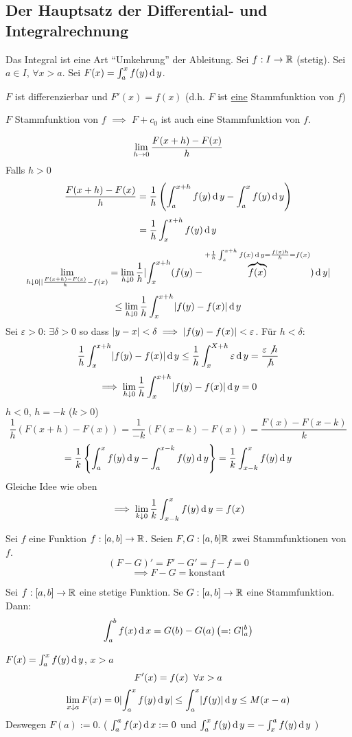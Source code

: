 \subsection{Der Hauptsatz der Differential- und Integralrechnung}
\begin{Sat}Das Integral ist eine Art ``Umkehrung'' der Ableitung.
  Sei $f:I\to\mathbb{R}$ (stetig). Sei $a\in I$, $\forall x>a$. Sei $F(x)=\int_a^xf(y)\operatorname{d} y$.
\end{Sat}
\begin{theorem}
  $F$ ist differenzierbar und $F'(x)=f(x)$ (d.h. $F$ ist \ul{eine} Stammfunktion von $f$)
\end{theorem}
\begin{Bem}
  $F$ Stammfunktion von $f$ $\implies$ $F+c_0$ ist auch eine Stammfunktion von $f$.
\end{Bem}
\begin{Bew}
  \[\displaystyle\lim_{h\rightarrow0}\frac{F(x+h)-F(x)}{h}\]
  Falls $h>0$
  \[\frac{F(x+h)-F(x)}{h}=\frac{1}{h}\left( \int_a^{x+h}f(y)\operatorname{d} y-\int_a^xf(y)\operatorname{d} y \right)\]
  \[=\frac{1}{h}\int_x^{x+h}f(y)\operatorname{d} y\]
  \[\lim_{h\downarrow 0\mathopen|  \mathclose|\frac{F(x+h)-F(x)}{h}-f(x)}=\lim_{h\downarrow 0}\frac{1}{h}\mathopen| \int_x^{x+h}(f(y)-\overbrace{f(x)}^{+\frac{1}{h}\int_x^{x+h}f(x)\operatorname{d} y=\frac{f(x)h}{h}=f(x)})\operatorname{d} y \mathclose|\]
  \[\leq\lim_{h\downarrow 0}\frac{1}{h}\int_x^{x+h}\mathopen| f(y)-f(x) \mathclose|\operatorname{d} y\]
  Sei $\varepsilon>0$: $\exists \delta>0$ so dass $\mathopen| y-x \mathclose|<\delta\implies\mathopen| f(y)-f(x) \mathclose|<\varepsilon$. Für $h<\delta$:
  \[\frac{1}{h}\int_x^{x+h}\mathopen| f(y)-f(x) \mathclose|\operatorname{d} y\leq \frac{1}{h}\int_x^{X+h}\varepsilon\operatorname{d} y=\frac{\varepsilon\not h}{\not h}\]
  \[\implies \lim_{h\downarrow 0}\frac{1}{h}\int_x^{x+h}\mathopen| f(y)-f(x) \mathclose|\operatorname{d} y=0\]
  $h<0$, $h=-k$ ($k>0$)
  \[\frac{1}{h}(F(x+h)-F(x))=\frac{1}{-k}(F(x-k)-F(x))=\frac{F(x)-F(x-k)}{k}\]
  \[=\frac{1}{k}\left\{ \int_a^xf(y)\operatorname{d} y-\int_a^{x-k}f(y)\operatorname{d} y \right\}=\frac{1}{k}\int_{x-k}^xf(y)\operatorname{d} y\]
  Gleiche Idee wie oben
  \[\implies \lim_{k\downarrow 0}\frac{1}{k}\int_{x-k}^xf(y)\operatorname{d} y=f(x)\]
\end{Bew}
\begin{Bem}
  Sei $f$ eine Funktion $f:[a,b]\to\mathbb{R}$. Seien $F,G:[a,b]\mathbb{R}$ zwei Stammfunktionen von $f$.
  \[(F-G)'=F'-G'=f-f=0\]
  \[\implies F-G=\text{konstant}\]
\end{Bem}
\begin{Kor}
  Sei $f:[a,b]\to\mathbb{R}$ eine stetige Funktion. Se $G:[a,b]\to\mathbb{R}$ eine Stammfunktion. Dann:
  \[\int_a^bf(x)\operatorname{d} x=G(b)-G(a)\left( =:G|_a^b \right)\]
\end{Kor}
\begin{Bew}
  $F(x)=\int_a^xf(y)\operatorname{d} y$, $x>a$
  \[F'(x)=f(x)\hspace{2mm}\forall x>a\]
  \[\lim_{x\downarrow a}F(x)=0 \mathopen| \int_a^xf(y)\operatorname{d} y \mathclose|\leq \int_a^x\mathopen| f(y) \mathclose|\operatorname{d} y\leq M(x-a)\]
  Deswegen $F(a):=0$. ( $\int_a^af(x)\operatorname{d} x:= 0$ und $\int_a^xf(y)\operatorname{d} y=-\int_x^af(y)\operatorname{d} y$ )
\end{Bew}
